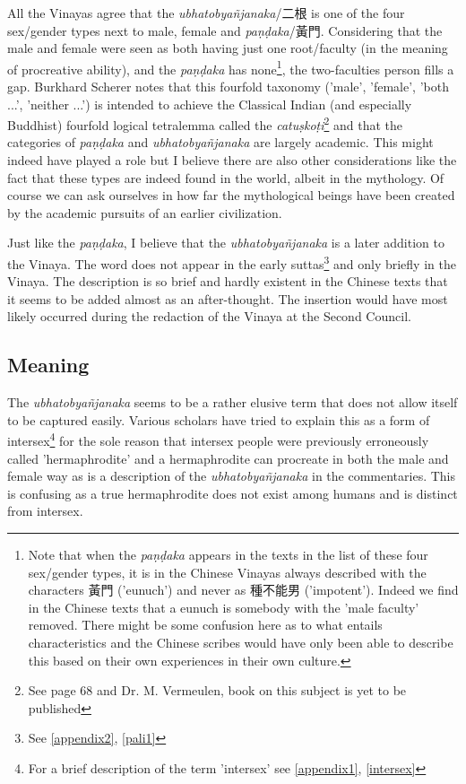 All the Vinayas agree that the {\em ubhatob­yañ­janaka}/二根 is one of the four sex/gender types next to male, female and {\em paṇḍaka}/黃門. Considering that the male and female were seen as both having just one root/faculty (in the meaning of procreative ability), and the {\em paṇḍaka} has none\footnote{Note that when the {\em paṇḍaka} appears in the texts in the list of these four sex/gender types, it is in the Chinese Vinayas always described with the characters 黃門 ('eunuch') and never as 種不能男 ('impotent'). Indeed we find in the Chinese texts that a eunuch is somebody with the 'male faculty' removed. There might be some confusion here as to what entails characteristics and the Chinese scribes would have only been able to describe this based on their own experiences in their own culture.}, the two-faculties person fills a gap. Burkhard Scherer notes that this fourfold taxonomy ('male', 'female', 'both ...', 'neither ...') is intended to achieve the Classical Indian (and especially Buddhist) fourfold logical tetralemma called the {\em catuṣkoṭi}\footnote{See \cite{scherer} page 68 and Dr. M. Vermeulen, book on this subject is yet to be published} and that the categories of {\em paṇḍaka} and {\em ubhatob­yañ­janaka} are largely academic. This might indeed have played a role but I believe there are also other considerations like the fact that these types are indeed found in the world, albeit in the mythology. Of course we can ask ourselves in how far the mythological beings have been created by the academic pursuits of an earlier civilization. 

Just like the {\em paṇḍaka}, I believe that the {\em ubhatob­yañ­janaka} is a later addition to the Vinaya. The word does not appear in the early suttas\footnote{See \ref{appendix2}, \ref{pali1}} and only briefly in the Vinaya. The description is so brief and hardly existent in the Chinese texts that it seems to be added almost as an after-thought. The insertion would have most likely occurred during the redaction of the Vinaya at the Second Council.

\subsection{Meaning}
The {\em ubhatob­yañ­janaka} seems to be a rather elusive term that does not allow itself to be captured easily. Various scholars have tried to explain this as a form of intersex\footnote{For a brief description of the term 'intersex' see \ref{appendix1}, \ref{intersex}} for the sole reason that intersex people were previously erroneously called 'hermaphrodite' and a hermaphrodite can procreate in both the male and female way as is a description of the {\em ubhatob­yañ­janaka} in the commentaries. This is confusing as a true hermaphrodite does not exist among humans and is distinct from intersex. 

